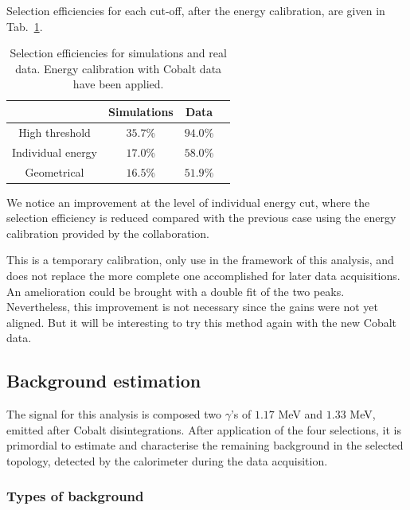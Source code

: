 Selection efficiencies for each cut-off, after the energy calibration, are given in Tab.~\ref{tab:Co_cut_eff_calib}.
\begin{table}[h]
  \centering
  \begin{tabular}{|c|c|c|c|}
    \hline
    & Simulations & Data \\
    \hline\hline
    High threshold & $35.7$\% & $94.0$\% \\
    Individual energy & $17.0$\% & $58.0$\% \\
    Geometrical & $16.5$\% & $51.9$\% \\
    \hline
  \end{tabular}
  \caption{Selection efficiencies for simulations and real data.
    Energy calibration with Cobalt data have been applied.
    \label{tab:Co_cut_eff_calib}}
\end{table}
We notice an improvement at the level of individual energy cut, where the selection efficiency is reduced compared with the previous case using the energy calibration provided by the collaboration.

This is a temporary calibration, only use in the framework of this analysis, and does not replace the more complete one accomplished for later data acquisitions.
An amelioration could be brought with a double fit of the two peaks.
Nevertheless, this improvement is not necessary since the gains were not yet aligned.
But it will be interesting to try this method again with the new Cobalt data.


\subsection{Background estimation}
\label{subsec:bkg_estimation}

The signal for this analysis is composed two $\gamma$'s of $1.17$ MeV and $1.33$ MeV, emitted after Cobalt disintegrations.
After application of the four selections, it is primordial to estimate and characterise the remaining background in the selected topology, detected by the calorimeter during the data acquisition.

\subsubsection*{Types of background}

